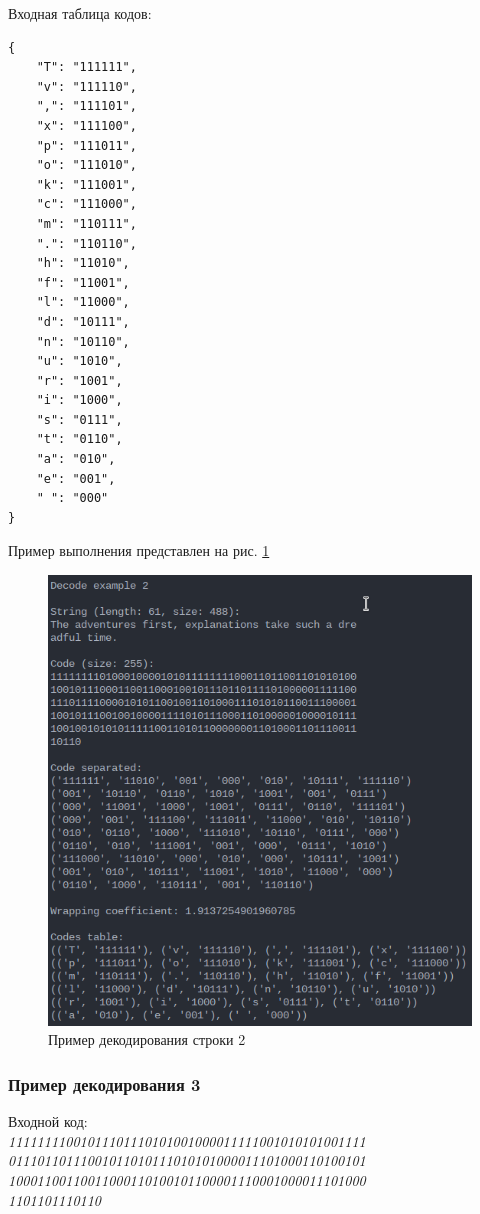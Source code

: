 Входная таблица кодов:\\ 
\begin{lstlisting}
{
    "T": "111111",
    "v": "111110",
    ",": "111101",
    "x": "111100",
    "p": "111011",
    "o": "111010",
    "k": "111001",
    "c": "111000",
    "m": "110111",
    ".": "110110",
    "h": "11010",
    "f": "11001",
    "l": "11000",
    "d": "10111",
    "n": "10110",
    "u": "1010",
    "r": "1001",
    "i": "1000",
    "s": "0111",
    "t": "0110",
    "a": "010",
    "e": "001",
    " ": "000"
}
\end{lstlisting}

Пример выполнения представлен на рис. \ref{fig:decode_example_2}

\begin{figure}[H]
    \centering
    \includegraphics[width=0.7\linewidth]{photo/decode_example_2}
    \caption{Пример декодирования строки 2}
    \label{fig:decode_example_2}
\end{figure}

\subsubsection*{Пример декодирования 3}

Входной код:\\ 
\textit{
11111111001011101110101001000011111001010101001111\\
01110110111001011010111010101000011101000110100101\\
10001100110011000110100101100001110001000011101000\\
1101101110110
}

